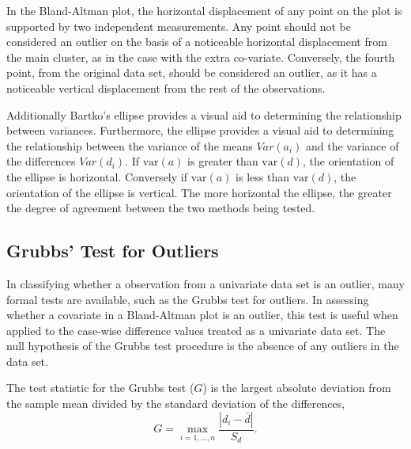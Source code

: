 \documentclass[12pt, a4paper]{report}
\theoremstyle{plain}
\theoremstyle{definition}
\theoremstyle{remark}
\begin{document}
In the Bland-Altman plot, the horizontal displacement of any point on the plot is supported by two independent measurements. Any point should not be considered an outlier on the basis of a noticeable horizontal displacement from the main cluster, as in the case with the extra co-variate. Conversely, the fourth point, from the original data set, should be considered an
outlier, as it has a noticeable vertical displacement from the rest of the observations.






Additionally Bartko's ellipse provides a visual aid to determining the
relationship between variances. 
Furthermore, the ellipse provides a visual aid to determining the relationship
between the variance of the means $Var(a_{i})$ and the variance of the differences $Var(d_{i})$. If $\mbox{var}(a)$ is greater than $\mbox{var}(d)$, the orientation of the ellipse is horizontal. Conversely if $\mbox{var}(a)$ is less than $\mbox{var}(d)$, the orientation of the ellipse is vertical. The more horizontal the ellipse, the greater the degree of agreement between the two methods being tested.





\subsection{Grubbs' Test for Outliers}


In classifying whether a observation from a univariate data set is an outlier, many formal tests are available, such as the Grubbs test for outliers. In assessing whether a covariate in a Bland-Altman plot is an outlier, this
test is useful when applied to the case-wise difference values treated as a univariate data set. The null hypothesis of the Grubbs test procedure is the absence of any outliers in the data set. 

The test statistic for the Grubbs test ($G$) is the largest absolute deviation from the sample mean divided by the standard
deviation of the differences,
\begin{equation}
G =  \displaystyle\max_{i=1,\ldots, n}\frac{\left \vert d_i -
	\bar{d}\right\vert}{S_{d}}.
\end{equation}
\end{document}
